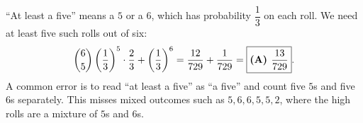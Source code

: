 ``At least a five'' means a $5$ or a $6$, which has probability $\dfrac13$ on each roll. We need at least five such rolls out of six:
\[\dbinom65\left(\dfrac13\right)^5\cdot\dfrac23+\left(\dfrac13\right)^6=\dfrac{12}{729}+\dfrac1{729}=\boxed{\textbf{(A) }\dfrac{13}{729}}.\]
A common error is to read ``at least a five'' as ``a five'' and count five $5$s and five $6$s separately. This misses mixed outcomes such as $5,6,6,5,5,2$, where the high rolls are a mixture of $5$s and $6$s.
